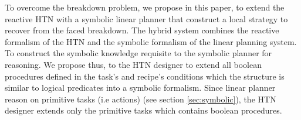 \documentclass[conference]{IEEEtran}
\begin{document}
	\par To overcome the breakdown problem, we propose in this paper, to extend the reactive HTN with a symbolic linear planner that construct a local strategy to recover from the faced breakdown. The hybrid system combines the reactive formalism of the HTN and the symbolic formalism of the linear planning system.
	To construct the symbolic knowledge requisite to the symbolic planner for reasoning. We propose thus,  to the HTN designer to extend all boolean procedures defined in the task's and recipe's conditions which the structure is similar to logical predicates  into a symbolic formalism. Since linear planner reason  on primitive tasks (i.e actions) (see section \ref{sec:symbolic}), the HTN designer extends only the primitive tasks which contains boolean procedures.
\end{document}
